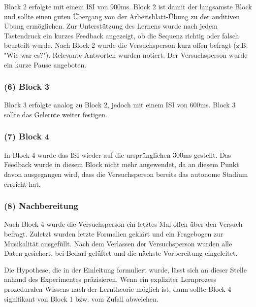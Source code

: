 \documentclass[doc,a4paper,12pt]{apa6}
\begin{document}
Block 2 erfolgte mit einem ISI von 900ms. Block 2 ist damit der langsamste Block und sollte einen guten Übergang von der Arbeitsblatt-Übung zu der auditiven Übung ermöglichen. Zur Unterstützung des Lernens wurde nach jedem Tastendruck ein kurzes Feedback angezeigt, ob die Sequenz richtig oder falsch beurteilt wurde. Nach Block 2 wurde die Versuchsperson kurz offen befragt (z.B. "Wie war es?"). Relevante Antworten wurden notiert. Der Versuchsperson wurde ein kurze Pause angeboten.

\subsubsection{(6) Block 3}

Block 3 erfolgte analog zu Block 2, jedoch mit einem ISI von 600ms. Block 3 sollte das Gelernte weiter festigen.

\subsubsection{(7) Block 4}

In Block 4 wurde das ISI wieder auf die ursprünglichen 300ms gestellt. Das Feedback wurde in diesem Block nicht mehr angewendet, da an diesem Punkt davon ausgegangen wird, dass die Versuchsperson bereits das autonome Stadium erreicht hat.

\subsubsection{(8) Nachbereitung}

Nach Block 4 wurde die Versuchsperson ein letztes Mal offen über den Versuch befragt. Zuletzt wurden letzte Formalien geklärt und ein Fragebogen zur Musikalität ausgefüllt. Nach dem Verlassen der Versuchsperson wurden alle Daten gesichert, bei Bedarf gelüftet und die nächste Vorbereitung eingeleitet.

Die Hypothese, die in der Einleitung formuliert wurde, lässt sich an dieser Stelle anhand des Experimentes präzisieren. Wenn ein expliziter Lernprozess prozeduralen Wissens nach der Lerntheorie möglich ist, dann sollte Block 4 signifikant von Block 1 bzw. vom Zufall abweichen.



\end{document}
